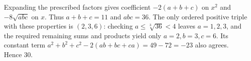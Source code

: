 Expanding the prescribed factors gives coefficient $-2(a+b+c)$ on $x^2$ and $-8\sqrt{abc}$ on $x$. Thus $a+b+c=11$ and $abc=36$. The only ordered positive triple with these properties is $(2,3,6)$: checking $a\le\sqrt[3]{36}<4$ leaves $a=1,2,3$, and the required remaining sums and products yield only $a=2,b=3,c=6$. Its constant term $a^2+b^2+c^2-2(ab+bc+ca)=49-72=-23$ also agrees. Hence $\boxed{30}$.
